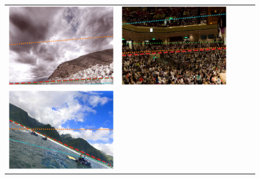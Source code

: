 \begin{figure}
\begin{tabular}{cccc|c}
\includegraphics[width=\exampleresultswidth\linewidth]{figures/method/results/pano_addtfngrqwwyvb_jpg-6.png} &
\includegraphics[width=\exampleresultswidth\linewidth]{figures/method/failures/pano_ayfpxwwfwgfweh_jpg-2.png} \\
\includegraphics[width=\exampleresultswidth\linewidth]{figures/method/results/pano_addgasjevqjafh_jpg-1.png} &

\end{tabular}
\end{figure}
